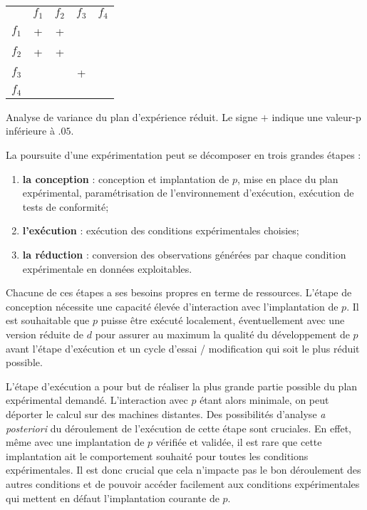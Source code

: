 \begin{margintable}
\begin{tabular}{ccccc}
  & $f_1$ & $f_2$ & $f_3$ & $f_4$ \\
$f_1$  &  + & + & & \\
$f_2$  & + & + & & \\
$f_3$  & & & + & \\
$f_4$  & & & & \\
\end{tabular}
\caption{Analyse de variance du plan d'expérience réduit. Le signe $+$ indique une valeur-p inférieure à $.05$.}
\label{tab:anova}
\end{margintable}


La poursuite d'une expérimentation peut se décomposer en trois grandes étapes :
\begin{enumerate}
  \item \textbf{la conception} : conception et implantation de $p$, mise en place du plan expérimental, paramétrisation de l'environnement d'exécution, exécution de tests de conformité;
  \item \textbf{l'exécution} : exécution des conditions expérimentales choisies;
  \item \textbf{la réduction} : conversion des observations générées par chaque condition expérimentale en données exploitables.
\end{enumerate}

Chacune de ces étapes a ses besoins propres en terme de ressources. L'étape de conception nécessite une capacité élevée d'interaction avec l'implantation de $p$. Il est souhaitable que $p$ puisse être exécuté localement, éventuellement avec une version réduite de $d$ pour assurer au maximum la qualité du développement de $p$ avant l'étape d'exécution et un cycle d'essai / modification qui soit le plus réduit possible.

L'étape d'exécution a pour but de réaliser la plus grande partie possible du plan expérimental demandé. L'interaction avec $p$ étant alors minimale, on peut déporter le calcul sur des machines distantes. Des possibilités d'analyse \textit{a posteriori} du déroulement de l'exécution de cette étape sont cruciales. En effet, même avec une implantation de $p$ vérifiée et validée, il est rare que cette implantation ait le comportement souhaité pour toutes les conditions expérimentales. Il est donc crucial que cela n'impacte pas le bon déroulement des autres conditions et de pouvoir accéder facilement aux conditions expérimentales qui mettent en défaut l'implantation courante de $p$.

